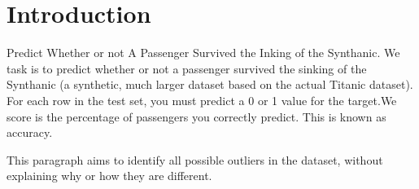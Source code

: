 \section{Introduction}\label{sec-intro}











{}
Predict Whether or not A Passenger Survived the Inking of the Synthanic.
We task is to predict whether or not a passenger survived the sinking of the Synthanic (a synthetic, much larger dataset based on the actual Titanic dataset). For each row in the test set, you must predict a 0 or 1 value for the target.We score is the percentage of passengers you correctly predict. This is known as accuracy.


{}
This paragraph  aims to identify all possible outliers in the dataset,
without explaining why or how they are different.

